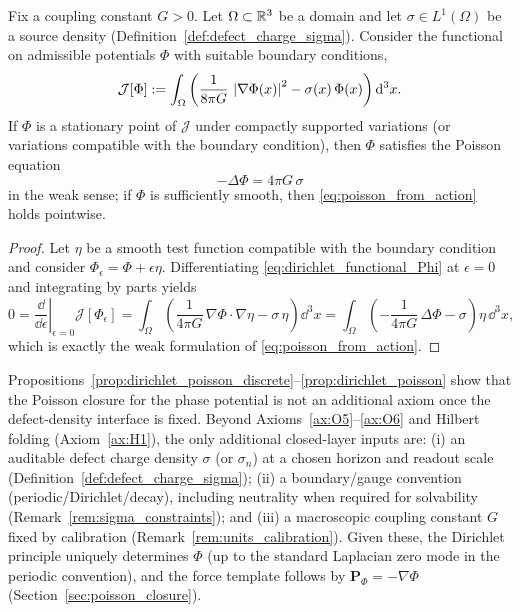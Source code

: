 \begin{proposition}
\label{prop:dirichlet_poisson}
Fix a coupling constant $G>0$.
Let $\Omega\subset\mathbb{R}^3$ be a domain and let $\sigma\in L^1(\Omega)$ be a source density (Definition~\ref{def:defect_charge_sigma}).
Consider the functional on admissible potentials $\Phi$ with suitable boundary conditions,
\begin{equation}
\label{eq:dirichlet_functional_Phi}
\mathcal{J}[\Phi]
:=
\int_\Omega \left(\frac{1}{8\pi G}\,\left\lvert \nabla\Phi(x)\right\rvert^2-\sigma(x)\,\Phi(x)\right)\mathrm{d}^3x.
\end{equation}
If $\Phi$ is a stationary point of $\mathcal{J}$ under compactly supported variations (or variations compatible with the boundary condition), then $\Phi$ satisfies the Poisson equation
\begin{equation}
\label{eq:poisson_from_action}
-\Delta\Phi=4\pi G\,\sigma
\end{equation}
in the weak sense; if $\Phi$ is sufficiently smooth, then \eqref{eq:poisson_from_action} holds pointwise.
\end{proposition}

\begin{proof}
Let $\eta$ be a smooth test function compatible with the boundary condition and consider $\Phi_\epsilon=\Phi+\epsilon\eta$.
Differentiating \eqref{eq:dirichlet_functional_Phi} at $\epsilon=0$ and integrating by parts yields
\[
0=\left.\frac{\dd}{\dd\epsilon}\right|_{\epsilon=0}\mathcal{J}[\Phi_\epsilon]
=\int_\Omega \left(\frac{1}{4\pi G}\,\nabla\Phi\cdot\nabla\eta-\sigma\,\eta\right)\dd^3x
=\int_\Omega \left(-\frac{1}{4\pi G}\,\Delta\Phi-\sigma\right)\eta\,\dd^3x,
\]
which is exactly the weak formulation of \eqref{eq:poisson_from_action}.
\end{proof}

\begin{remark}
\label{rem:minimal_poisson_input}
Propositions~\ref{prop:dirichlet_poisson_discrete}--\ref{prop:dirichlet_poisson} show that the Poisson closure for the phase potential is not an additional axiom once the defect-density interface is fixed.
Beyond Axioms~\ref{ax:O5}--\ref{ax:O6} and Hilbert folding (Axiom~\ref{ax:H1}), the only additional closed-layer inputs are:
(i) an auditable defect charge density $\sigma$ (or $\sigma_n$) at a chosen horizon and readout scale (Definition~\ref{def:defect_charge_sigma});
(ii) a boundary/gauge convention (periodic/Dirichlet/decay), including neutrality when required for solvability (Remark~\ref{rem:sigma_constraints});
and (iii) a macroscopic coupling constant $G$ fixed by calibration (Remark~\ref{rem:units_calibration}).
Given these, the Dirichlet principle uniquely determines $\Phi$ (up to the standard Laplacian zero mode in the periodic convention), and the force template follows by $\mathbf{P}_\Phi=-\nabla\Phi$ (Section~\ref{sec:poisson_closure}).
\end{remark}


